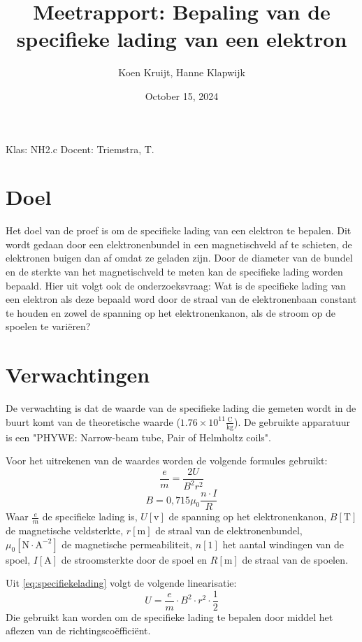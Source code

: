 \documentclass{article}
\title{Meetrapport: Bepaling van de specifieke lading van een elektron}
\author{Koen Kruijt, Hanne Klapwijk}
\date{October 15, 2024}
\begin{document}
\maketitle

Klas: NH2.c \newline
Docent: Triemstra, T.

\newpage
\tableofcontents
\newpage
\section{Doel}
Het doel van de proef is om de specifieke lading van een elektron te bepalen. Dit wordt gedaan door een elektronenbundel in een magnetischveld af te schieten, de elektronen buigen dan af omdat ze geladen zijn. Door de diameter van de bundel en de sterkte van het magnetischveld te meten kan de specifieke lading worden bepaald.
Hier uit volgt ook de onderzoeksvraag: Wat is de specifieke lading van een elektron als deze bepaald word door de straal van de elektronenbaan constant te houden en zowel de spanning op het elektronenkanon, als de stroom op de spoelen te variëren?

\section{Verwachtingen}
De verwachting is dat de waarde van de specifieke lading die gemeten wordt in de buurt komt van de theoretische waarde ($1.76 \times 10^{11} \mathrm{\frac{C}{kg}}$\cite{masscharge}). De gebruikte apparatuur is een "PHYWE: Narrow-beam tube, Pair of Helmholtz coils".

Voor het uitrekenen van de waardes worden de volgende formules gebruikt:
\begin{equation}
	\frac{e}{m} = \frac{2U}{B^2r^2}
	\label{eq:specifiekelading}
\end{equation}
\begin{equation}
	B = 0,715\mu_0 \frac{n \cdot I}{R}
	\label{eq:magnetischveld}
\end{equation}
Waar $\frac{e}{m}$ de specifieke lading is, $U \mathrm{[v]}$ de spanning op het elektronenkanon, $B \mathrm{[T]}$ de magnetische veldsterkte, $r \mathrm{[m]}$ de straal van de elektronenbundel, $\mu_0 \mathrm{[N\cdot A^{-2}]}$ de magnetische permeabiliteit, $n \mathrm{[1]}$ het aantal windingen van de spoel, $I \mathrm{[A]}$ de stroomsterkte door de spoel en $R \mathrm{[m]}$ de straal van de spoelen.

Uit \ref{eq:specifiekelading} volgt de volgende linearisatie:
\begin{equation}
	U =\frac{e}{m} \cdot B^2 \cdot r^2 \cdot \frac{1}{2}
	\label{eq:linearisatie}
\end{equation}
Die gebruikt kan worden om de specifieke lading te bepalen door middel het aflezen van de richtingscoëfficiënt.
\end{document}
